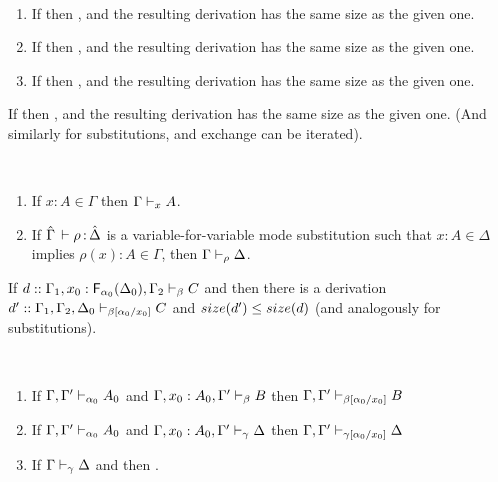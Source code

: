 \begin{lemma} \label{lem:weakening} ~
\begin{enumerate}
\item If  then
, and the resulting
derivation has the same size as the given one.  
\item If  then
, and the resulting
derivation has the same size as the given one.  
\item If  then
, and the resulting
derivation has the same size as the given one.  
\end{enumerate}
\end{lemma}

\begin{lemma} \label{lem:exchange}
If  then
, and the resulting derivation
has the same size as the given one.  (And similarly for substitutions,
and exchange can be iterated).  
\end{lemma}

\begin{theorem}[Identity] ~ \label{thm:identity}
\begin{enumerate}
\item If $x:A \in \Gamma$ then $\Gamma \vdash_{x} A$.
\item If $\hat{\Gamma} \, \vdash \rho \, \mathit{:} \, \hat{\Delta}$ is a
  variable-for-variable mode substitution such that $x:A \in \Delta$
  implies $\rho(x) : A \in \Gamma$, then $\Gamma \vdash_{\rho} \Delta$.
\end{enumerate}
\end{theorem}

\begin{lemma} \label{lem:Finv}
If $d :: \Gamma_1,x_0:\mathsf{F}_{\alpha_0}(\Delta_0),\Gamma_2 \vdash_{\beta} C$
and then there is a derivation $d' ::
\Gamma_1,\Gamma_2,\Delta_0 \vdash_{\beta[\alpha_0/x_0]} C$ and
$size(d') \le size(d)$ (and analogously for substitutions).
\end{lemma}

\begin{theorem}[Cut] ~ \label{thm:cut}
\begin{enumerate} 
\item  If $\Gamma,\Gamma' \vdash_{\alpha_0} A_0$ and $\Gamma,x_0:A_0,\Gamma' \vdash_{\beta} B$ 
then $\Gamma,\Gamma' \vdash_{\beta[\alpha_0/x_0]} B$ 
\item If $\Gamma,\Gamma' \vdash_{\alpha_0} A_0$ and $\Gamma,x_0:A_0,\Gamma' \vdash_{\gamma} \Delta$ 
then $\Gamma,\Gamma' \vdash_{\gamma[\alpha_0/x_0]} \Delta$ 
\item If $\Gamma \vdash_{\gamma} \Delta$ and 
then .  
\end{enumerate}
\end{theorem}

